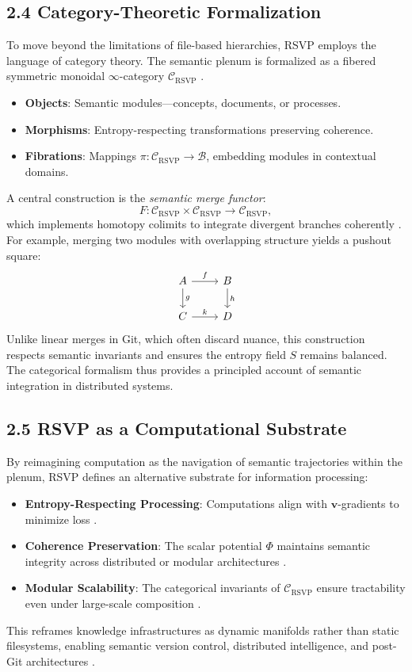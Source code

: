 \documentclass[12pt]{article}
\begin{document}
\subsection*{2.4 Category-Theoretic Formalization}
To move beyond the limitations of file-based hierarchies, RSVP employs the language 
of category theory. The semantic plenum is formalized as a fibered symmetric monoidal 
\(\infty\)-category \(\mathcal{C}_{\text{RSVP}}\) \citep{maclane1998, lawvere2009}. 
\begin{itemize}
    \item \textbf{Objects}: Semantic modules—concepts, documents, or processes.  
    \item \textbf{Morphisms}: Entropy-respecting transformations preserving coherence.  
    \item \textbf{Fibrations}: Mappings \(\pi : \mathcal{C}_{\text{RSVP}} \to \mathcal{B}\), embedding modules 
    in contextual domains.  
\end{itemize}
A central construction is the \emph{semantic merge functor}:
\[
F : \mathcal{C}_{\text{RSVP}} \times \mathcal{C}_{\text{RSVP}} \to \mathcal{C}_{\text{RSVP}},
\]
which implements homotopy colimits to integrate divergent branches coherently 
\citep{hatcher2002, milewski2018}. For example, merging two modules with overlapping 
structure yields a pushout square:
\[
\begin{tikzcd}
A \arrow[r, "f"] \arrow[d, "g"] & B \arrow[d, "h"] \\
C \arrow[r, "k"] & D
\end{tikzcd}
\]
Unlike linear merges in Git, which often discard nuance, this construction respects 
semantic invariants and ensures the entropy field \(S\) remains balanced. The categorical 
formalism thus provides a principled account of semantic integration in distributed 
systems.

\subsection*{2.5 RSVP as a Computational Substrate}
By reimagining computation as the navigation of semantic trajectories within the plenum, 
RSVP defines an alternative substrate for information processing:
\begin{itemize}
    \item \textbf{Entropy-Respecting Processing}: Computations align with \(\mathbf{v}\)-gradients 
    to minimize loss \citep{cover2006}.
    \item \textbf{Coherence Preservation}: The scalar potential \(\Phi\) maintains semantic integrity 
    across distributed or modular architectures \citep{gromov1999}.
    \item \textbf{Modular Scalability}: The categorical invariants of \(\mathcal{C}_{\text{RSVP}}\) 
    ensure tractability even under large-scale composition \citep{lawvere2009}.
\end{itemize}
This reframes knowledge infrastructures as dynamic manifolds rather than static 
filesystems, enabling semantic version control, distributed intelligence, and 
post-Git architectures \citep{whitehead1978}.
\end{document}
